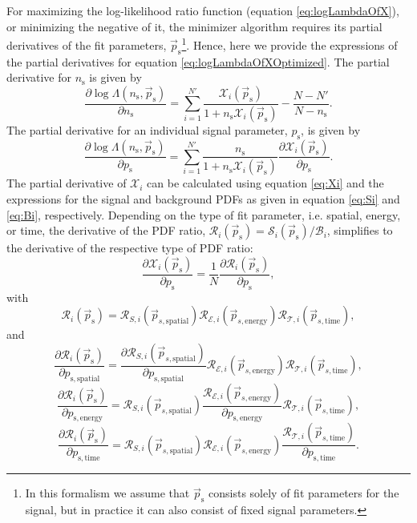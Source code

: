 \documentclass{article}
\newcommand{\ns}{n_{\mathrm{s}}}
\newcommand{\ps}{\vec{p}_{\mathrm{s}}}
\begin{document}
For maximizing the log-likelihood ratio function (equation \ref{eq:logLambdaOfX}),
or minimizing the negative of it, the minimizer algorithm requires its partial
derivatives of the fit parameters, $\ps$\footnote{In this formalism we assume that $\ps$
consists solely of fit parameters for the signal, but in practice it can also consist of fixed
signal parameters.}. Hence, here we provide the expressions of the partial derivatives
for equation \ref{eq:logLambdaOfXOptimized}.
The partial derivative for $\ns$ is given by
\begin{equation}
\frac{\partial \log \Lambda(\ns,\ps)}{\partial \ns} = \sum_{i=1}^{N'} \frac{\mathcal{X}_i(\ps)}{1+\ns \mathcal{X}_i(\ps)} - \frac{N - N'}{N - \ns}.
\end{equation}
The partial derivative for an individual signal parameter, $p_{\mathrm{s}}$,
is given by
\begin{equation}
 \frac{\partial \log \Lambda(\ns,\ps)}{\partial p_{\mathrm{s}}} = \sum_{i=1}^{N'} \frac{\ns}{1+\ns\mathcal{X}_i(\ps)} \frac{\partial \mathcal{X}_i(\ps)}{\partial p_{\mathrm{s}}}.
\end{equation}
The partial derivative of $\mathcal{X}_i$ can be calculated using
equation \ref{eq:Xi} and the expressions for the signal and background PDFs as given
in equation \ref{eq:Si} and \ref{eq:Bi}, respectively. Depending on the type of
fit parameter, i.e. spatial, energy, or time, the derivative of the PDF ratio,
$\mathcal{R}_i(\ps) = \mathcal{S}_i(\ps) / \mathcal{B}_i$, simplifies to the
derivative of the respective type of PDF ratio:
\begin{equation}
 \frac{\partial \mathcal{X}_i(\ps)}{\partial p_{\mathrm{s}}} = \frac{1}{N}\frac{\partial \mathcal{R}_i(\ps)}{\partial p_{\mathrm{s}}},
\end{equation}
with
\begin{equation}
 \mathcal{R}_i(\ps) = \mathcal{R}_{S,i}(\vec{p}_{s,\mathrm{spatial}}) \mathcal{R}_{\mathcal{E},i}(\vec{p}_{s,\mathrm{energy}}) \mathcal{R}_{\mathcal{T},i}(\vec{p}_{s,\mathrm{time}}),
\end{equation}
and
\begin{equation}
 \frac{\partial \mathcal{R}_i(\ps)}{\partial p_{\mathrm{s,spatial}}} = \frac{\partial \mathcal{R}_{S,i}(\vec{p}_{s,\mathrm{spatial}})}{\partial p_{\mathrm{s,spatial}}} \mathcal{R}_{\mathcal{E},i}(\vec{p}_{s,\mathrm{energy}}) \mathcal{R}_{\mathcal{T},i}(\vec{p}_{s,\mathrm{time}}),
\end{equation}
\begin{equation}
 \frac{\partial \mathcal{R}_i(\ps)}{\partial p_{\mathrm{s,energy}}} = \mathcal{R}_{S,i}(\vec{p}_{s,\mathrm{spatial}}) \frac{\mathcal{R}_{\mathcal{E},i}(\vec{p}_{s,\mathrm{energy}})}{\partial p_{\mathrm{s,energy}}} \mathcal{R}_{\mathcal{T},i}(\vec{p}_{s,\mathrm{time}}),
\end{equation}
\begin{equation}
 \frac{\partial \mathcal{R}_i(\ps)}{\partial p_{\mathrm{s,time}}} = \mathcal{R}_{S,i}(\vec{p}_{s,\mathrm{spatial}}) \mathcal{R}_{\mathcal{E},i}(\vec{p}_{s,\mathrm{energy}}) \frac{\mathcal{R}_{\mathcal{T},i}(\vec{p}_{s,\mathrm{time}})}{\partial p_{\mathrm{s,time}}}.
\end{equation}
\end{document}
